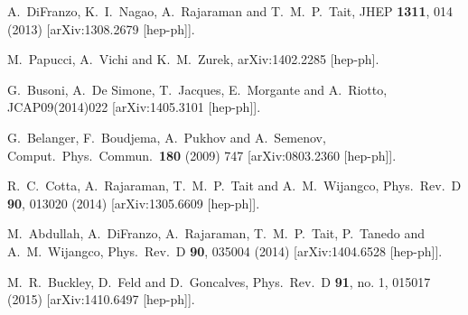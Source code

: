 \begin{thebibliography}{90}
  A.~DiFranzo, K.~I.~Nagao, A.~Rajaraman and T.~M.~P.~Tait,
  JHEP {\bf 1311}, 014 (2013)
  [arXiv:1308.2679 [hep-ph]].
  
  M.~Papucci, A.~Vichi and K.~M.~Zurek,
  arXiv:1402.2285 [hep-ph].
  
  G.~Busoni, A.~De Simone, T.~Jacques, E.~Morgante and A.~Riotto,
  JCAP09(2014)022
  [arXiv:1405.3101 [hep-ph]].

  G.~Belanger, F.~Boudjema, A.~Pukhov and A.~Semenov,
  Comput.\ Phys.\ Commun.\  {\bf 180} (2009) 747
  [arXiv:0803.2360 [hep-ph]].


  R.~C.~Cotta, A.~Rajaraman, T.~M.~P.~Tait and A.~M.~Wijangco,
  Phys.\ Rev.\ D {\bf 90}, 013020 (2014)
  [arXiv:1305.6609 [hep-ph]].

  M.~Abdullah, A.~DiFranzo, A.~Rajaraman, T.~M.~P.~Tait, P.~Tanedo and A.~M.~Wijangco,
  Phys.\ Rev.\ D {\bf 90}, 035004 (2014)
  [arXiv:1404.6528 [hep-ph]].
  
  M.~R.~Buckley, D.~Feld and D.~Goncalves,
  Phys.\ Rev.\ D {\bf 91}, no. 1, 015017 (2015)
  [arXiv:1410.6497 [hep-ph]].
  

\end{thebibliography}
